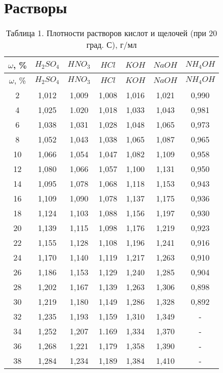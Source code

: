 \section*{Растворы}
\begin{longtable}[H]{|c|c|c|c|c|c|c|}
\caption{Таблица 1. Плотности растворов кислот и щелочей (при 20 град. С), г/мл}\label{tabular:konz}\\
\hline 
$\omega $, \% & $H_{2}SO_{4}$ & $HNO_{3}$ & $HCl$ & $KOH$ & $NaOH$ & $NH_{4}OH$\\
\hline\endfirsthead
\hline 
$\omega $, \% & $H_{2}SO_{4}$ & $HNO_{3}$ & $HCl$ & $KOH$ & $NaOH$ & $NH_{4}OH$\\
\endhead
 2 & 1,012 & 1,009 & 1,008 & 1,016 & 1,021 & 0,990\\
\hline 4 & 1,025 & 1.020 & 1,018 & 1,033 & 1,043 & 0,981\\
\hline 6 & 1,038 & 1,031 & 1,028 & 1,048 & 1,065 & 0,973\\
\hline 8 & 1,052 & 1,043 & 1,038 & 1,065 & 1,087 & 0,965\\
\hline 10 & 1,066 & 1,054 & 1,047 & 1,082 & 1,109 & 0,958\\
\hline 12 & 1,080 & 1,066 & 1,057 & 1,100 & 1,131 & 0,950\\
\hline 14 & 1,095 & 1,078 & 1,068 & 1,118 & 1,153 & 0,943\\
\hline 16 & 1,109 & 1,090 & 1,078 & 1,137 & 1,175 & 0,936\\
\hline 18 & 1,124 & 1,103 & 1,088 & 1,156 & 1,197 & 0,930\\
\hline 20 & 1,139 & 1,115 & 1,098 & 1,176 & 1,219 & 0,923\\
\hline 22 & 1,155 & 1,128 & 1,108 & 1,196 & 1,241 & 0,916\\
\hline 24 & 1,170 & 1,140 & 1,119 & 1,217 & 1,263 & 0,910\\
\hline 26 & 1,186 & 1,153 & 1,129 & 1,240 & 1,285 & 0,904\\
\hline 28 & 1,202 & 1,167 & 1,139 & 1,263 & 1,306 & 0,898\\
\hline 30 & 1,219 & 1,180 & 1,149 & 1,286 & 1,328 & 0,892\\
\hline 32 & 1,235 & 1,193 & 1,159 & 1,310 & 1,349 & -\\
\hline 34 & 1,252 & 1,207 & 1.169 & 1,334 & 1,370 & -\\
\hline 36 & 1,268 & 1,221 & 1,179 & 1,358 & 1,390 & -\\
\hline 38 & 1,284 & 1,234 & 1,189 & 1,384 & 1,410 & -\\

\end{longtable}

